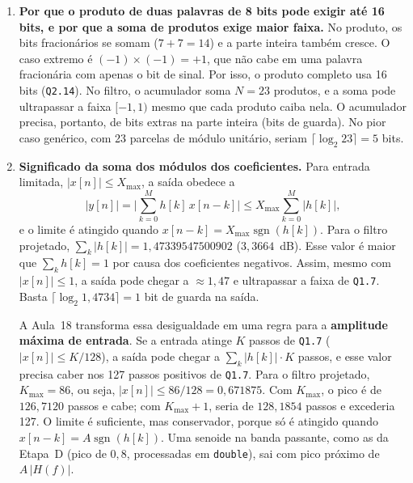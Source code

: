 \documentclass[11pt,a4paper]{article}
\newcommand{\MetricaENormaLI}{1{,}47339547500902}
\newcommand{\MetricaENormaLIdB}{3{,}3664}
\newcommand{\MetricaEKMax}{86}
\newcommand{\MetricaEAMax}{0{,}671875}
\newcommand{\MetricaEPicoK}{126{,}7120}
\newcommand{\MetricaEPicoKI}{128{,}1854}
\begin{document}
\begin{enumerate}[leftmargin=1.6em, itemsep=3pt]
    \item \textbf{Por que o produto de duas palavras de 8 bits pode exigir até 16 bits, e por que a soma de produtos exige maior faixa.}
    No produto, os bits fracionários se somam ($7 + 7 = 14$) e a parte inteira também cresce. O caso extremo é $(-1) \times (-1) = +1$, que não cabe em uma palavra fracionária com apenas o bit de sinal. Por isso, o produto completo usa 16 bits (\texttt{Q2.14}). No filtro, o acumulador soma $N = 23$ produtos, e a soma pode ultrapassar a faixa $[-1, 1)$ mesmo que cada produto caiba nela. O acumulador precisa, portanto, de bits extras na parte inteira (bits de guarda). No pior caso genérico, com 23 parcelas de módulo unitário, seriam $\lceil\log_2 23\rceil = 5$ bits.

    \item \textbf{Significado da soma dos módulos dos coeficientes.}
    Para entrada limitada, $|x[n]| \le X_{\max}$, a saída obedece a
    \begin{equation}
        |y[n]| = \Big|\sum_{k=0}^{M} h[k]\,x[n-k]\Big| \le X_{\max}\sum_{k=0}^{M} |h[k]|,
    \end{equation}
    e o limite é atingido quando $x[n-k] = X_{\max}\operatorname{sgn}(h[k])$. Para o filtro projetado, $\sum_k |h[k]| = \MetricaENormaLI$ ($\MetricaENormaLIdB$~\si{dB}). Esse valor é maior que $\sum_k h[k] = 1$ por causa dos coeficientes negativos. Assim, mesmo com $|x[n]| \le 1$, a saída pode chegar a $\approx 1,47$ e ultrapassar a faixa de \texttt{Q1.7}. Basta $\lceil\log_2 1,4734\rceil = 1$ bit de guarda na saída.

    A Aula~18 transforma essa desigualdade em uma regra para a \textbf{amplitude máxima de entrada}. Se a entrada atinge $K$ passos de \texttt{Q1.7} ($|x[n]| \le K/128$), a saída pode chegar a $\sum_k|h[k]|\cdot K$ passos, e esse valor precisa caber nos 127 passos positivos de \texttt{Q1.7}. Para o filtro projetado, $K_{\max} = \MetricaEKMax$, ou seja, $|x[n]| \le \MetricaEKMax/128 = \MetricaEAMax$. Com $K_{\max}$, o pico é de $\MetricaEPicoK$ passos e cabe; com $K_{\max} + 1$, seria de $\MetricaEPicoKI$ passos e excederia 127. O limite é suficiente, mas conservador, porque só é atingido quando $x[n-k] = A\operatorname{sgn}(h[k])$. Uma senoide na banda passante, como as da Etapa~D (pico de $0,8$, processadas em \texttt{double}), sai com pico próximo de $A\,|H(f)|$.


\end{enumerate}
\end{document}
